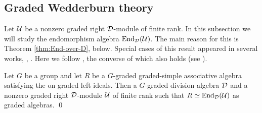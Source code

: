 \subsection{Graded Wedderburn theory}\label{ssec:Grd-Wedderburn-Theory}

Let $\mathcal U$ be a nonzero graded right $\mathcal{D}$-module of finite rank. 
In this subsection we will study the endomorphism algebra $\operatorname{End}_{\mathcal{D}} (\mathcal U)$. 
The main reason for this is Theorem \ref{thm:End-over-D}, below. 
Special cases of this result appeared in several works, \eg, \cite{BSZ01,MR2046303,BZ02}. 
Here we follow \cite[Theorem 2.6]{livromicha}, the converse of which also holds (see \cite[page 31]{livromicha}).

\begin{thm}\label{thm:End-over-D}
    Let $G$ be a group and let $R$ be a $G$-graded graded-simple associative algebra satisfying the \dcc on graded left ideals. 
	Then a $G$-graded division algebra $\mathcal{D}$ and a nonzero graded right $\mathcal{D}$-module $\mathcal U$ of finite rank such that $R \simeq \operatorname{End}_{\mathcal{D}} (\mathcal U)$ as graded algebras. \qed
\end{thm}



